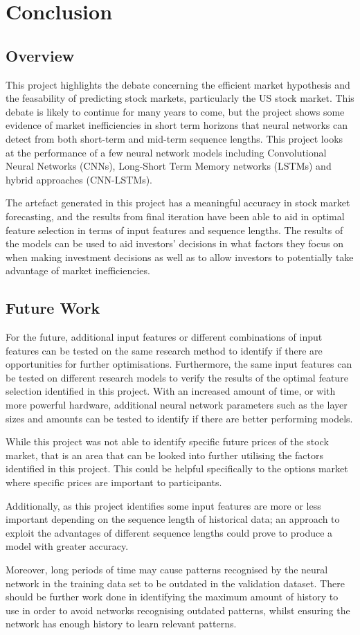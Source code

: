 \chapter{Conclusion} \label{chap:conclusion}
\section{Overview}
This project highlights the debate concerning the efficient market hypothesis and the feasability
of predicting stock markets, particularly the US stock market. This debate is likely to continue 
for many years to come, but the project shows some evidence of market inefficiencies in short term
horizons that neural networks can detect from both short-term and mid-term sequence lengths.
This project looks at the performance of a few neural network models including Convolutional Neural
Networks (CNNs), Long-Short Term Memory networks (LSTMs) and hybrid approaches (CNN-LSTMs).

The artefact generated in this project has a meaningful accuracy in stock market forecasting,
and the results from final iteration have been able to aid in optimal feature selection in terms
of input features and sequence lengths. The results of the models can be used to aid investors'
decisions in what factors they focus on when making investment decisions as well as to allow
investors to potentially take advantage of market inefficiencies.

\section{Future Work}
For the future, additional input features or different combinations of input features can be tested
on the same research method to identify if there are opportunities for further optimisations.
Furthermore, the same input features can be tested on different research models to verify the results
of the optimal feature selection identified in this project. With an increased amount of time, or with
more powerful hardware, additional neural network parameters such as the layer sizes and amounts can be
tested to identify if there are better performing models.

While this project was not able to identify specific future prices of the stock market, that is an
area that can be looked into further utilising the factors identified in this project. This could be
helpful specifically to the options market where specific prices are important to participants.

Additionally, as this project identifies some input features are more or less important depending on
the sequence length of historical data; an approach to exploit the advantages of different
sequence lengths could prove to produce a model with greater accuracy.

Moreover, long periods of time may cause patterns recognised by the neural network in the training data
set to be outdated in the validation dataset. There should be further work done in identifying the maximum
amount of history to use in order to avoid networks recognising outdated patterns, whilst ensuring the
network has enough history to learn relevant patterns.
